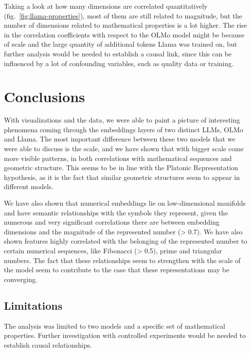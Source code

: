 \documentclass[
  a4paper, twoside, 10pt, titlepage]{book}
\begin{document}
Taking a look at how many dimensions are correlated quantitatively
(fig.~\ref{fig:llama-properties}), most of them are still related to
magnitude, but the number of dimensions related to mathematical
properties is a lot higher. The rise in the correlation coefficients
with respect to the OLMo model might be because of scale and the large
quantity of additional tokens Llama was trained on, but further analysis
would be needed to establish a causal link, since this can be influenced
by a lot of confounding variables, such as quality data or training.

\chapter{Conclusions}\label{conclusions}

With visualizations and the data, we were able to paint a picture of
interesting phenomena coming through the embeddings layers of two
distinct LLMs, OLMo and Llama. The most important difference between
these two models that we were able to discuss is the scale, and we have
shown that with bigger scale come more visible patterns, in both
correlations with mathematical sequences and geometric structure. This
seems to be in line with the Platonic Representation hypothesis, as it
is the fact that similar geometric structures seem to appear in
different models.

We have also shown that numerical embeddings lie on low-dimensional
manifolds and have semantic relationships with the symbols they
represent, given the numerous and very significant correlations there
are between embedding dimensions and the magnitude of the represented
number (\textgreater{} 0.7). We have also shown features highly
correlated with the belonging of the represented number to certain
numerical sequences, like Fibonacci (\textgreater{} 0.5), prime and
triangular numbers. The fact that these relationships seem to strengthen
with the scale of the model seem to contribute to the case that these
representations may be converging.

\section{Limitations}\label{limitations}

The analysis was limited to two models and a specific set of
mathematical properties. Further investigation with controlled
experiments would be needed to establish causal relationships.
\end{document}
